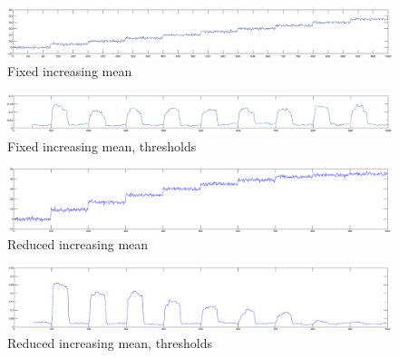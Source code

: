 
\begin{figure}
\centering
  \includegraphics[width=1\textwidth]{./Figures/chapter5/camci_fixed_increasing_mean.eps}
  \caption[Fixed increasing mean]{Fixed increasing mean}
  \label{fig:camci_fixed_increasing_mean}
\end{figure}

\begin{figure}
\centering
  \includegraphics[width=1\textwidth]{./Figures/chapter5/camci_fixed_increasing_mean_thresholds.eps}
  \caption[Fixed increasing mean, thresholds]{Fixed increasing mean, thresholds}
  \label{fig:camci_fixed_increasing_mean_thresholds}
\end{figure}


\begin{figure}
\centering
  \includegraphics[width=1\textwidth]{./Figures/chapter5/takeuchi_reduced_increasing_mean.eps}
  \caption[Reduced increasing mean]{Reduced increasing mean}
  \label{fig:takeuchi_reduced_increasing_mean}
\end{figure}

\begin{figure}
\centering
  \includegraphics[width=1\textwidth]{./Figures/chapter5/takeuchi_reduced_increasing_mean_thresholds.eps}
  \caption[Reduced increasing mean, thresholds]{Reduced increasing mean, thresholds}
  \label{fig:takeuchi_reduced_increasing_mean_thresholds}
\end{figure}


